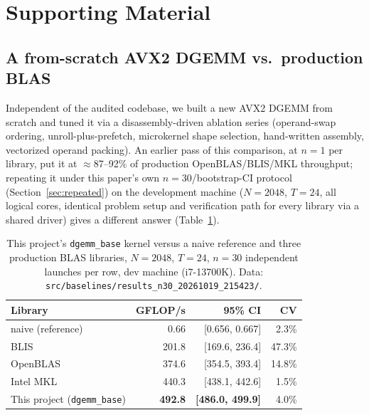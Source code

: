 \documentclass[acmsmall]{acmart}
\begin{document}
\section{Supporting Material}
\label{sec:supporting}

\subsection{A from-scratch AVX2 DGEMM vs.\ production BLAS}
\label{sec:blas-baseline}
Independent of the audited codebase, we built a new AVX2 DGEMM from
scratch and tuned it via a disassembly-driven ablation series
(operand-swap ordering, unroll-plus-prefetch, microkernel shape
selection, hand-written assembly, vectorized operand packing). An
earlier pass of this comparison, at $n{=}1$ per library, put it at
$\approx$87--92\% of production OpenBLAS/BLIS/MKL throughput; repeating
it under this paper's own $n{=}30$/bootstrap-CI protocol
(Section~\ref{sec:repeated}) on the development machine ($N{=}2048$,
$T{=}24$, all logical cores, identical problem setup and verification
path for every library via a shared driver) gives a different answer
(Table~\ref{tab:blas-baseline}).

\begin{table}[h]
\centering
\caption{This project's \texttt{dgemm\_base} kernel versus a naive
reference and three production BLAS libraries, $N{=}2048$, $T{=}24$,
$n{=}30$ independent launches per row, dev machine (i7-13700K). Data:
\texttt{src/baselines/results\_n30\_20261019\_215423/}.}
\label{tab:blas-baseline}
\begin{tabular}{lrrr}
\toprule
Library & GFLOP/s & 95\% CI & CV \\
\midrule
naive (reference)     & 0.66   & [0.656, 0.667]   & 2.3\% \\
BLIS                   & 201.8  & [169.6, 236.4]   & 47.3\% \\
OpenBLAS               & 374.6  & [354.5, 393.4]   & 14.8\% \\
Intel MKL              & 440.3  & [438.1, 442.6]   & 1.5\% \\
This project (\texttt{dgemm\_base}) & \textbf{492.8} & \textbf{[486.0, 499.9]} & 4.0\% \\
\bottomrule
\end{tabular}
\end{table}
\end{document}

